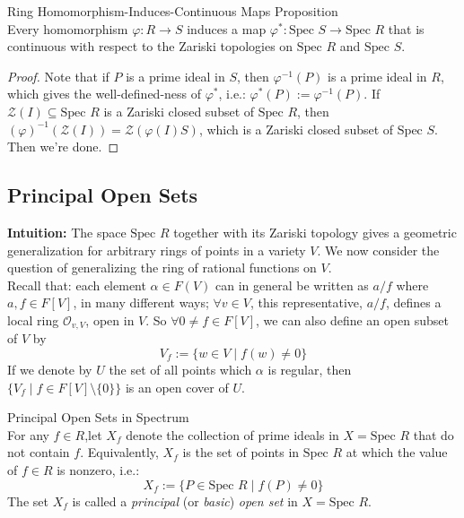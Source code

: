 \begin{proposition}{Ring Homomorphism-Induces-Continuous Maps Proposition}\\
Every homomorphism $\varphi: R\to S$ induces a map $\varphi^*: \text{Spec }S \to \text{Spec }R$ that is continuous with respect to the Zariski topologies on $\text{Spec }R$ and $\text{Spec }S$.
\end{proposition}

\begin{proof}
    Note that if $P$ is a prime ideal in $S$, then $\varphi^{-1} (P)$ is a prime ideal in $R$, which gives the well-defined-ness of $\varphi^*$, i.e.: $\varphi^* (P):= \varphi^{-1} (P)$. If $\mathcal{Z} (I) \subseteq \text{Spec }R$ is a Zariski closed subset of $\text{Spec }R$, then $(\varphi)^{-1} (\mathcal{Z} (I)) =\mathcal{Z} (\varphi (I)S)$, which is a Zariski closed subset of $\text{Spec }S$. Then we're done.
\end{proof}

\subsection{Principal Open Sets}

\noindent\textbf{Intuition:} The space $\text{Spec }R$ together with its Zariski topology gives a geometric generalization for arbitrary rings of points in a variety $V$. We now consider the question of generalizing the ring of rational functions on $V$.\\
Recall that: each element $\alpha \in F(V)$ can in general be written as $a/f$ where $a,f \in F[V]$, in many different ways; $\forall v\in V$, this representative, $a/f$, defines a local ring $\mathcal{O} _{v,V}$, open in $V$. So $\forall 0\neq f\in F[V]$, we can also define an open subset of $V$ by
$$V_f:= \{w\in V \mid f(w) \neq 0\}$$
If we denote by $U$ the set of all points which $\alpha$ is regular, then $\{V_f\mid f\in F[V] \setminus \{0\}\}$ is an open cover of $U$.

\begin{definition}{Principal Open Sets in Spectrum}\\
For any $f \in R$,let $X_f$ denote the collection of prime ideals in $X=\text{Spec }R$ that do not contain $f$. Equivalently, $X_f$ is the set of points in $\text{Spec }R$ at which the value of $f \in R$ is nonzero, i.e.:
$$X_f :=\{ P\in \text{Spec }R \mid f(P) \neq 0\}$$
The set $X_f$ is called a \textit{principal} (or \textit{basic}) \textit{open set} in $X=\text{Spec }R$.
\end{definition}

